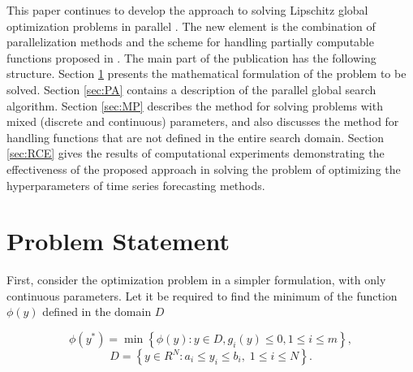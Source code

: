 \documentclass[runningheads]{llncs}
\begin{document}
This paper continues to develop the approach to solving Lipschitz global optimization problems in parallel \cite{Barkalov2018,Gegrel2021,Strongin2018}. The new element is the combination of parallelization methods and the scheme for handling partially computable functions proposed in \cite{Usova2024}. The main part of the publication has the following structure.  Section \ref{sec:PS} presents the mathematical formulation of the problem to be solved. Section \ref{sec:PA} contains a description of the parallel global search algorithm. Section \ref{sec:MP} describes the method for solving problems with mixed (discrete and continuous) parameters, and also discusses the method for handling functions that are not defined in the entire search domain. Section \ref{sec:RCE} gives the results of computational experiments demonstrating the effectiveness of the proposed approach in solving the problem of optimizing the hyperparameters of time series forecasting methods.

\section{Problem Statement}\label{sec:PS}
First, consider the optimization problem in a simpler formulation, with only continuous parameters. Let it be required to find the minimum of the function $\phi(y)$ defined in the domain $D$

\begin{equation} \label{problem}
\phi(y^*) = \min \left\{\phi(y): y \in D, g_i(y) \leq 0, 1 \leq i \leq m\right\}, 
\end{equation}
\[ D=\left\{ y \in R^N: a_i \leq y_i \leq b_i, \; 1 \leq i \leq N\right\}. \]
\end{document}
